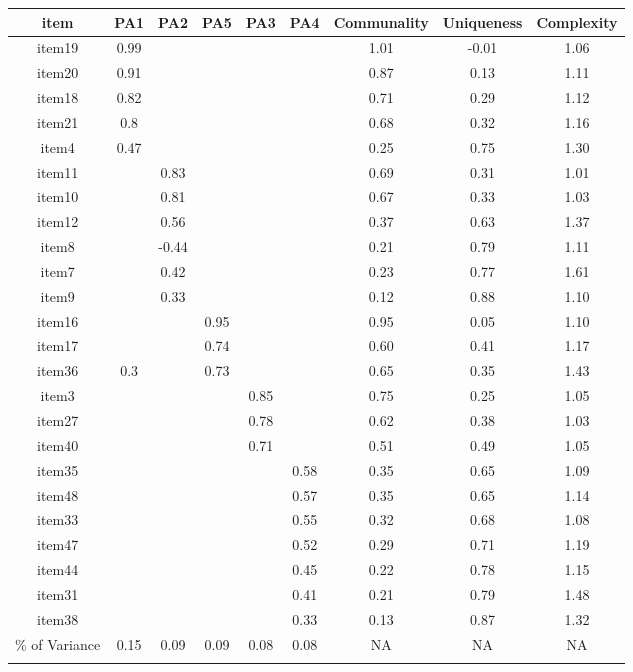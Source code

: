 \begin{appendix}
\begin{table}[h]
\begin{center}
\begin{threeparttable}
{\begin{tabular}{ccccccccc}
\toprule
item & \multicolumn{1}{c}{PA1} & \multicolumn{1}{c}{PA2} & \multicolumn{1}{c}{PA5} & \multicolumn{1}{c}{PA3} & \multicolumn{1}{c}{PA4} & \multicolumn{1}{c}{Communality} & \multicolumn{1}{c}{Uniqueness} & \multicolumn{1}{c}{Complexity}\\
\midrule
item19 & 0.99 &  &  &  &  & 1.01 & -0.01 & 1.06\\
item20 & 0.91 &  &  &  &  & 0.87 & 0.13 & 1.11\\
item18 & 0.82 &  &  &  &  & 0.71 & 0.29 & 1.12\\
item21 & 0.8 &  &  &  &  & 0.68 & 0.32 & 1.16\\
item4 & 0.47 &  &  &  &  & 0.25 & 0.75 & 1.30\\
item11 &  & 0.83 &  &  &  & 0.69 & 0.31 & 1.01\\
item10 &  & 0.81 &  &  &  & 0.67 & 0.33 & 1.03\\
item12 &  & 0.56 &  &  &  & 0.37 & 0.63 & 1.37\\
item8 &  & -0.44 &  &  &  & 0.21 & 0.79 & 1.11\\
item7 &  & 0.42 &  &  &  & 0.23 & 0.77 & 1.61\\
item9 &  & 0.33 &  &  &  & 0.12 & 0.88 & 1.10\\
item16 &  &  & 0.95 &  &  & 0.95 & 0.05 & 1.10\\
item17 &  &  & 0.74 &  &  & 0.60 & 0.41 & 1.17\\
item36 & 0.3 &  & 0.73 &  &  & 0.65 & 0.35 & 1.43\\
item3 &  &  &  & 0.85 &  & 0.75 & 0.25 & 1.05\\
item27 &  &  &  & 0.78 &  & 0.62 & 0.38 & 1.03\\
item40 &  &  &  & 0.71 &  & 0.51 & 0.49 & 1.05\\
item35 &  &  &  &  & 0.58 & 0.35 & 0.65 & 1.09\\
item48 &  &  &  &  & 0.57 & 0.35 & 0.65 & 1.14\\
item33 &  &  &  &  & 0.55 & 0.32 & 0.68 & 1.08\\
item47 &  &  &  &  & 0.52 & 0.29 & 0.71 & 1.19\\
item44 &  &  &  &  & 0.45 & 0.22 & 0.78 & 1.15\\
item31 &  &  &  &  & 0.41 & 0.21 & 0.79 & 1.48\\
item38 &  &  &  &  & 0.33 & 0.13 & 0.87 & 1.32\\
\% of Variance & 0.15 & 0.09 & 0.09 & 0.08 & 0.08 & NA & NA & NA\\
\bottomrule
\addlinespace
\end{tabular}

}
\end{threeparttable}
\end{center}
\end{table}
\end{appendix}
